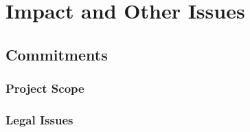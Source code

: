 \section{Impact and Other Issues}

\subsection{Commitments}

\subsubsection{Project Scope}

\subsubsection{Legal Issues}